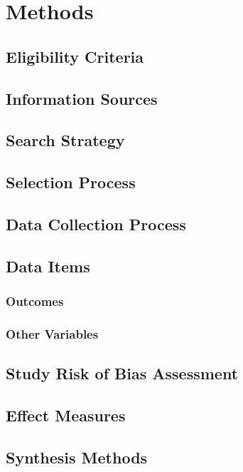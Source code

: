 \chapter{Methods}
\label{chapterlabel4}

\section{Eligibility Criteria}


\section{Information Sources}


\section{Search Strategy}


\section{Selection Process}


\section{Data Collection Process}


\section{Data Items}

    \subsection{Outcomes}


    \subsection{Other Variables}


\section{Study Risk of Bias Assessment}


\section{Effect Measures}


\section{Synthesis Methods}

